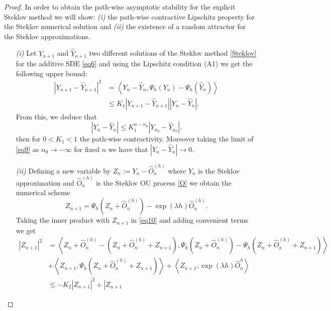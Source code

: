 \begin{proof}
	In order to obtain the path-wise asymptotic stability for the explicit Steklov
	method we will show: {\it (i)} the path-wise contractive Lipschitz property for the
	Steklov numerical solution and {\it (ii)} the existence of a random attractor for
	the Steklov approximations.
	\begin{enumerate}
		\item[{\it(i)}]
			Let $Y_{n+1}$ and $\widehat{Y}_{n+1}$ two different solutions of 
			the Steklov method \eqref{Steklov} for the additive SDE \eqref{eq6} and using
			the Lipschitz condition (A1) we get the following upper bound:
			\begin{align*}
				|Y_{n+1}-\widehat{Y}_{n+1}|^2
				&=
				\left\langle
				Y_{n}-\widehat{Y}_{n},\Psi_h(Y_n)-\Psi_h(\widehat{Y}_n)
				\right\rangle\\
				&
				\leq
				K_1|Y_{n+1}-\widehat{Y}_{n+1}||Y_{n}-\widehat{Y}_{n}|.
			\end{align*}
			From this, we deduce that
			\begin{equation}\label{eq9}
				|Y_{n}-\widehat{Y}_{n}|\leq K_1^{n-n_0}|Y_{n_0}-\widehat{Y}_{n_0}|.
			\end{equation}
			then for $0<K_1<1$ the path-wise contractivity. Moreover taking the limit of
			\eqref{eq9} as $n_0\to -\infty $ for fixed $n$ we have that
			$|Y_{n}-\widehat{Y}_{n}|\to 0$.
		\item[{\it(ii)}]
			Defining a new variable by  $Z_n:=Y_n-\widehat{O}_n^{(h)}$ where 
			$Y_n$ is the Steklov approximation and $\widehat{O}_n^{(h)}$ is the Steklov OU
			process \eqref{O} we obtain the numerical scheme
			\begin{equation}\label{eq10}
				Z_{n+1}=\Psi_h(Z_n+\widehat{O}_n^{(h)}) -\exp(\lambda h)\widehat{O}_n^{(h)}.
			\end{equation}
			Taking the inner product with $Z_{n+1}$ in \eqref{eq10} and adding convenient
			terms we get
			\begin{align*}
				|Z_{n+1}|^2
				&=
				\left\langle
					Z_n+\widehat{O}_n^{(h)}-(Z_n+\widehat{O}_n^{(h)}+Z_{n+1}),
					\Psi_h(Z_n+\widehat{O}_n^{(h)})-\Psi_h(Z_n+\widehat{O}_n^{(h)}+Z_{n+1})
				\right\rangle\\
				&+
				\left\langle
					Z_{n+1},
					\Psi_h(Z_n+\widehat{O}_n^{(h)}+Z_{n+1})
				\right\rangle
				+
				\left\langle
					Z_{n+1},
					\exp{(\lambda h)}\widehat{O}^{h}_n
				\right\rangle\\
				&\leq
				-K_2|Z_{n+1}|^2
				+
				\left|
				Z_{n+1}

\end{align*}
\end{enumerate}
\end{proof}
